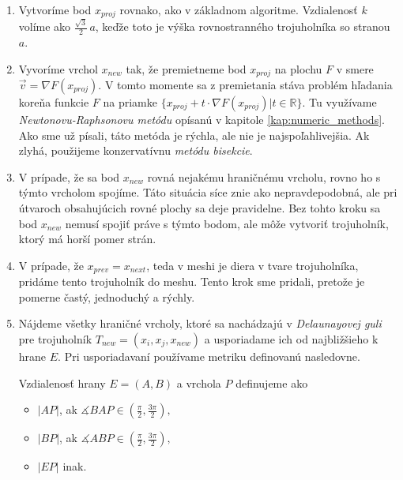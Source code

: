 \begin{enumerate}
    \item{
        Vytvoríme bod $x_{proj}$ rovnako, ako v základnom algoritme. Vzdialenosť $k$ volíme
        ako $\frac{\sqrt 3}{2} \, a$, keďže toto je výška rovnostranného trojuholníka so stranou $a$.
    }
    \item{
        Vyvoríme vrchol $x_{new}$ tak, že premietneme bod $x_{proj}$ na plochu $F$ v smere 
        $\vec{v} = \nabla F(x_{proj})$. V tomto momente sa z premietania 
        stáva problém hľadania koreňa funkcie $F$ na priamke 
        $\{x_{proj} + t \cdot \nabla F(x_{proj}) | t \in \mathbb{R}\}$.  
        Tu využívame
        \textit{Newtonovu-Raphsonovu metódu} opísanú v kapitole \ref{kap:numeric_methods}. Ako sme 
        už písali, táto metóda je rýchla, ale nie je najspoľahlivejšia. Ak zlyhá,
        použijeme konzervatívnu \textit{metódu bisekcie}.
    }
    \item{
        V prípade, že sa bod $x_{new}$ rovná nejakému hraničnému vrcholu, rovno ho s týmto vrcholom
        spojíme. Táto situácia síce znie ako nepravdepodobná, ale pri útvaroch obsahujúcich rovné plochy sa
        deje pravidelne. Bez tohto kroku sa bod $x_{new}$ nemusí spojiť práve s týmto bodom, ale
        môže vytvoriť trojuholník, ktorý má horší pomer strán.
    }
    \item{
        V prípade, že $x_{prev} = x_{next}$, teda v meshi je diera v tvare trojuholníka, pridáme tento 
        trojuholník do meshu. Tento krok sme pridali, pretože je pomerne častý, jednoduchý a rýchly.
    }
    \item{
        Nájdeme všetky hraničné vrcholy, ktoré sa nachádzajú v \textit{Delaunayovej guli} pre trojuholník 
        $T_{new} = (x_i, x_j, x_{new})$ a usporiadame ich od najbližšieho k hrane $E$. Pri usporiadavaní 
        používame metriku definovanú nasledovne.

        \begin{definition} Vzdialenosť hrany $E=(A,B)$ a vrchola $P$ definujeme ako
        \label{def:segment_point_distance}
        \begin{itemize}
            \item{
                $|AP|$, ak $\measuredangle BAP \in (\frac{\pi}{2}, \frac{3\pi}{2}),$
            }

            \item{
                $|BP|$, ak $\measuredangle ABP \in (\frac{\pi}{2}, \frac{3\pi}{2}),$
            }

            \item{
                $|EP|$ inak.
            }


\end{itemize}
\end{definition}}
\end{enumerate}
